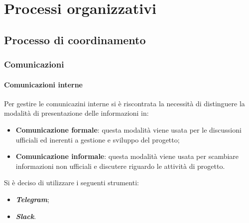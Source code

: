 \newpage
\section{Processi organizzativi}
\subsection{Processo di coordinamento}

\subsubsection{Comunicazioni}
\paragraph{Comunicazioni interne}
	Per gestire le comunicazini interne si è riscontrata la necessità di distinguere la modalità di presentazione delle informazioni in:
	\begin{itemize}
	\item\textbf{Comunicazione formale}: questa modalità viene usata per le discussioni ufficiali ed inerenti a gestione e sviluppo del progetto; 
	\item\textbf{Comunicazione informale}: questa modalità viene usata per scambiare informazioni non ufficiali e discutere riguardo le attività di progetto.
	\end{itemize}
	
	Si è deciso di utilizzare i seguenti strumenti:
	\begin{itemize}
	\item\textbf{\textit{Telegram}};
	\item\textbf{\textit{Slack}}.
	\end{itemize}
	
